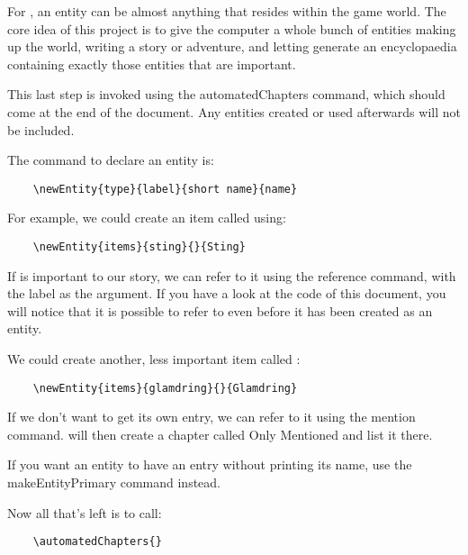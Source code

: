 \documentclass[openany]{book}
\begin{document}
For \RpgTex{}, an entity can be almost anything that resides within the game world. The core idea of this project is to give the computer a whole bunch of entities making up the world, writing a story or adventure, and letting \RpgTex{} generate an encyclopaedia containing exactly those entities that are important.

This last step is invoked using the automatedChapters command, which should come at the end of the document. Any entities created or used afterwards will not be included.

The command to declare an entity is:
\begin{verbatim}
	\newEntity{type}{label}{short name}{name}
\end{verbatim}
For example, we could create an item called  using:
\begin{verbatim}
	\newEntity{items}{sting}{}{Sting}
\end{verbatim}
If  is important to our story, we can refer to it using the reference command, with the label as the argument. If you have a look at the code of this document, you will notice that it is possible to refer to  even before it has been created as an entity.

We could create another, less important item called :
\begin{verbatim}
	\newEntity{items}{glamdring}{}{Glamdring}
\end{verbatim}
If we don't want  to get its own entry, we can refer to it using the mention command. \RpgTex{} will then create a chapter called Only Mentioned and list it there.

If you want an entity to have an entry without printing its name, use the makeEntityPrimary command instead.


Now all that's left is to call:
\begin{verbatim}
	\automatedChapters{}
\end{verbatim}

\automatedChapters{}
\end{document}

